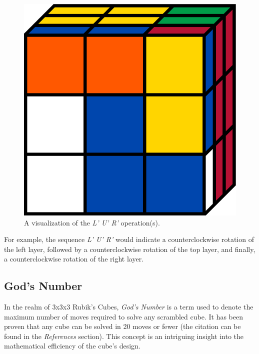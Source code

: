 \documentclass[12pt]{article}
\begin{document}
\begin{figure}[h]
\begin{minipage}[c]{0.2\textwidth}
    \end{minipage}
    \begin{minipage}[c]{0.05\textwidth}
        \centering
    \end{minipage}
    \hspace{0.5cm}
    \begin{minipage}[c]{0.2\textwidth}
        \includegraphics[scale=0.1]{moves/cubeLpUpRp.png}
    \end{minipage}
    \caption{A visualization of the \textit{L' U' R'} operation(s).}
\end{figure}

For example, the sequence \textit{L' U' R'} would indicate a counterclockwise rotation of the left layer, followed by a counterclockwise rotation of the top layer, and finally, a counterclockwise rotation of the right layer.

\subsection{God's Number}
In the realm of 3x3x3 Rubik's Cubes, \textit{God's Number} is a term used to denote the maximum number of moves required to solve any scrambled cube. It has been proven that any cube can be solved in 20 moves or fewer (the citation can be found in the \textit{References} section). This concept is an intriguing insight into the mathematical efficiency of the cube's design.
\end{document}
